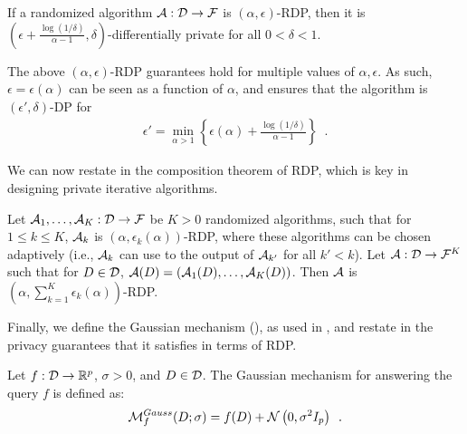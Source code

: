 \begin{lemma}
  \label{lemma:rdp-to-dp}
  If a randomized algorithm $\mathcal A : \mathcal D \rightarrow \mathcal F$
  is $(\alpha, \epsilon)$-RDP, then it is
  $(\epsilon + \frac{\log(1/\delta)}{\alpha - 1}, \delta)$-differentially
  private for all $0 < \delta < 1$.
\end{lemma}

\begin{remark}
  \label{rmq:rdp-to-dp}
  The above $(\alpha,\epsilon)$-RDP guarantees hold for multiple
  values of $\alpha,\epsilon$. As such, $\epsilon = \epsilon(\alpha)$
  can be seen as a function of $\alpha$, and 
  ensures that the algorithm is $(\epsilon', \delta)$-DP for
  \begin{align}
    \epsilon' = \min_{\alpha > 1} \left\{ \epsilon(\alpha) + \frac{\log(1/\delta)}{\alpha - 1} \right\}\enspace.
  \end{align}
\end{remark}

We can now restate in  the composition
theorem of RDP, which is key in designing private iterative
algorithms.

\begin{theorem}
  \label{thm:rdp-composition}
  Let $\mathcal A_1, \dots, \mathcal A_K : \mathcal D \rightarrow \mathcal F$ be $K > 0$
  randomized algorithms, such that for $1 \le k \le K$, $\mathcal A_k$
  is $(\alpha, \epsilon_k(\alpha))$-RDP,
  where these algorithms can be chosen adaptively (i.e., $\mathcal A_k$ can use
  to the output of $\mathcal A_{k'}$ for all $k' < k$).
  Let $\mathcal A : \mathcal D \rightarrow \mathcal F^K$ such that for $D \in \mathcal D$,
  $\mathcal A(D) = (\mathcal A_1(D), \dots, \mathcal A_K(D))$.
  Then $\mathcal A$ is $\left(\alpha, \sum_{k=1}^K \epsilon_k(\alpha)\right)$-RDP.
\end{theorem}



Finally, we define the Gaussian mechanism (), as used
in , and restate in  the
privacy guarantees that it satisfies in terms of RDP.

\begin{definition}
  \label{def:gaussian-mechanism}
  Let $f: \mathcal D \rightarrow \mathbb R^p$, $\sigma > 0$, and $D \in \mathcal D$.
  The Gaussian mechanism for answering the query $f$ is defined as:
  \begin{align}
    \mathcal M_f^{Gauss}(D; \sigma) = f(D) + \mathcal N\left( 0, \sigma^2 I_p
    \right)\enspace.
  \end{align}
\end{definition}


